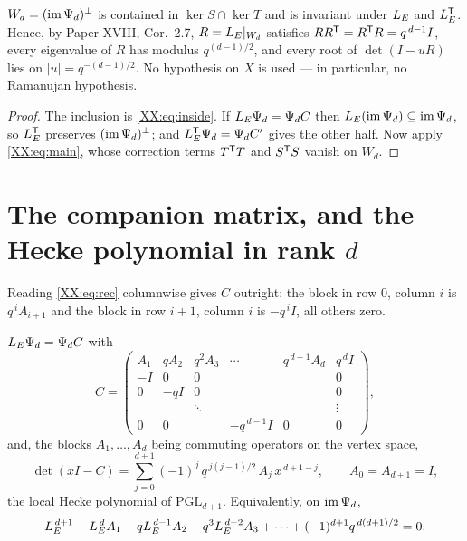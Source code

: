 \begin{corollary}\label{XX:cor:W}
$W_d=(\operatorname{im}\Psi_d)^{\perp}$ is contained in $\ker S\cap\ker T$ and is invariant under $L_E$ and
$L_E^{\mathsf{T}}$. Hence, by Paper XVIII, Cor.~2.7, $R=L_E|_{W_d}$ satisfies
$RR^{\mathsf{T}}=R^{\mathsf{T}}R=q^{\,d-1}I$, every eigenvalue of $R$ has modulus $q^{(d-1)/2}$, and every
root of $\det(I-uR)$ lies on $|u|=q^{-(d-1)/2}$. No hypothesis on $X$ is used --- in
particular, no Ramanujan hypothesis.
\end{corollary}

\begin{proof}
The inclusion is \eqref{XX:eq:inside}. If $L_E\Psi_d=\Psi_dC$ then $L_E(\operatorname{im}\Psi_d)\subseteq
\operatorname{im}\Psi_d$, so $L_E^{\mathsf{T}}$ preserves $(\operatorname{im}\Psi_d)^{\perp}$; and $L_E^{\mathsf{T}}\Psi_d=\Psi_dC'$
gives the other half. Now apply \eqref{XX:eq:main}, whose correction terms $T^{\mathsf{T}}T$ and
$S^{\mathsf{T}}S$ vanish on $W_d$.
\end{proof}

\section{\texorpdfstring{The companion matrix, and the Hecke polynomial in rank $d$}{The companion matrix, and the Hecke polynomial in rank d}}

Reading \eqref{XX:eq:rec} columnwise gives $C$ outright: the block in row $0$, column $i$ is
$q^{\,i}A_{i+1}$ and the block in row $i+1$, column $i$ is $-q^{\,i}I$, all others zero.

\begin{theorem}\label{XX:thm:hecke}
$L_E\Psi_d=\Psi_dC$ with
\[
  C=\begin{pmatrix}
     A_1 & qA_2 & q^{2}A_3 & \cdots & q^{\,d-1}A_d & q^{\,d}I\\
     -I  & 0    & 0        &        &              & 0\\
     0   & -qI  & 0        &        &              & 0\\
         &      & \ddots   &        &              & \vdots\\
     0   & 0    &          & -q^{\,d-1}I & 0       & 0
    \end{pmatrix},
\]
and, the blocks $A_1,\dots,A_d$ being commuting operators on the vertex space,
\[
  \det(xI-C)=\sum_{j=0}^{d+1}(-1)^{j}\,q^{\,j(j-1)/2}\,A_j\,x^{\,d+1-j},
  \qquad A_0=A_{d+1}=I ,
\]
the local Hecke polynomial of $\mathrm{PGL}_{d+1}$. Equivalently, on $\operatorname{im}\Psi_d$,
\[
  L_E^{\,d+1}-L_E^{\,d}A_1+qL_E^{\,d-1}A_2-q^{3}L_E^{\,d-2}A_3+\cdots
  +(-1)^{d+1}q^{\,d(d+1)/2}=0 .
\]
\end{theorem}

